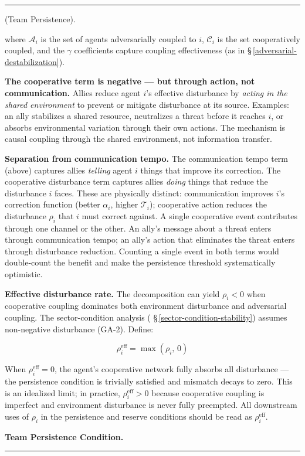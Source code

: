 \documentclass[11pt,oneside]{article}
\newcounter{claim}[section]
\renewcommand{\theclaim}{\thesection.\arabic{claim}}
\newenvironment{segment}[2]{%
  \refstepcounter{claim}%
  \bigskip\noindent\hrule\smallskip
  \noindent{\bfseries #1~\theclaim}\enskip(#2).\par\smallskip
  \noindent\ignorespaces
}{%
  \par\smallskip\noindent\hrule\bigskip
}
\newenvironment{proposition}[1][]{\begin{segment}{Proposition}{#1}}{\end{segment}}
\begin{document}
\begin{proposition}[Team Persistence]
where $\mathcal A_i$ is the set of agents adversarially coupled to $i$, $\mathcal C_i$ is the set cooperatively coupled, and the $\gamma$ coefficients capture coupling effectiveness (as in \S\,\ref{adversarial-destabilization}).

\textbf{The cooperative term is negative — but through action, not communication.} Allies reduce agent $i$'s effective disturbance by \textit{acting in the shared environment} to prevent or mitigate disturbance at its source. Examples: an ally stabilizes a shared resource, neutralizes a threat before it reaches $i$, or absorbs environmental variation through their own actions. The mechanism is causal coupling through the shared environment, not information transfer.

\textbf{Separation from communication tempo.} The communication tempo term (above) captures allies \textit{telling} agent $i$ things that improve its correction. The cooperative disturbance term captures allies \textit{doing} things that reduce the disturbance $i$ faces. These are physically distinct: communication improves $i$'s correction function (better $\alpha_i$, higher $\mathcal{T}_i$); cooperative action reduces the disturbance $\rho_i$ that $i$ must correct against. A single cooperative event contributes through one channel or the other. An ally's message about a threat enters through communication tempo; an ally's action that eliminates the threat enters through disturbance reduction. Counting a single event in both terms would double-count the benefit and make the persistence threshold systematically optimistic.

\textbf{Effective disturbance rate.} The decomposition can yield $\rho_i < 0$ when cooperative coupling dominates both environment disturbance and adversarial coupling. The sector-condition analysis ( \S\,\ref{sector-condition-stability}) assumes non-negative disturbance (GA-2). Define:


$$\rho_i^{\text{eff}} = \max(\rho_i, \, 0)$$

When $\rho_i^{\text{eff}} = 0$, the agent's cooperative network fully absorbs all disturbance — the persistence condition is trivially satisfied and mismatch decays to zero. This is an idealized limit; in practice, $\rho_i^{\text{eff}} > 0$ because cooperative coupling is imperfect and environment disturbance is never fully preempted. All downstream uses of $\rho_i$ in the persistence and reserve conditions should be read as $\rho_i^{\text{eff}}$.


\medskip\noindent\textbf{Team Persistence Condition.}



\end{proposition}
\end{document}
